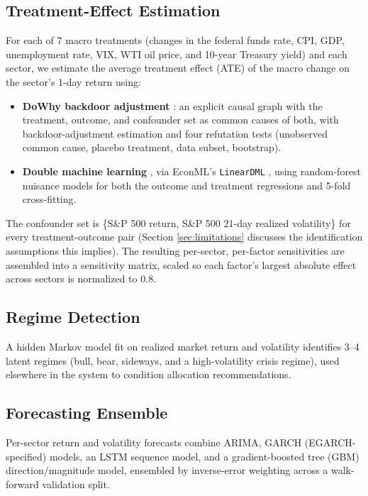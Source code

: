 \documentclass[10pt,twocolumn]{article}
\begin{document}
\subsection{Treatment-Effect Estimation}
For each of 7 macro treatments (changes in the federal funds rate, CPI,
GDP, unemployment rate, VIX, WTI oil price, and 10-year Treasury yield)
and each sector, we estimate the average treatment effect (ATE) of the
macro change on the sector's 1-day return using:
\begin{itemize}
  \item \textbf{DoWhy backdoor adjustment} \citep{sharma2020dowhy}: an
  explicit causal graph with the treatment, outcome, and confounder set
  as common causes of both, with backdoor-adjustment estimation and four
  refutation tests (unobserved common cause, placebo treatment, data
  subset, bootstrap).
  \item \textbf{Double machine learning} \citep{chernozhukov2018double},
  via EconML's \texttt{LinearDML} \citep{battocchi2019econml}, using
  random-forest nuisance models for both the outcome and treatment
  regressions and 5-fold cross-fitting.
\end{itemize}
The confounder set is \{S\&P 500 return, S\&P 500 21-day realized
volatility\} for every treatment-outcome pair (Section
\ref{sec:limitations} discusses the identification assumptions this
implies). The resulting per-sector, per-factor sensitivities are
assembled into a sensitivity matrix, scaled so each factor's largest
absolute effect across sectors is normalized to $0.8$.

\subsection{Regime Detection}
A hidden Markov model \citep{hamilton1989new} fit on realized market
return and volatility identifies 3--4 latent regimes (bull, bear,
sideways, and a high-volatility crisis regime), used elsewhere in the
system to condition allocation recommendations.

\subsection{Forecasting Ensemble}
Per-sector return and volatility forecasts combine ARIMA, GARCH
(EGARCH-specified) models, an LSTM sequence model, and a gradient-boosted
tree (GBM) direction/magnitude model, ensembled by inverse-error
weighting across a walk-forward validation split.
\end{document}
